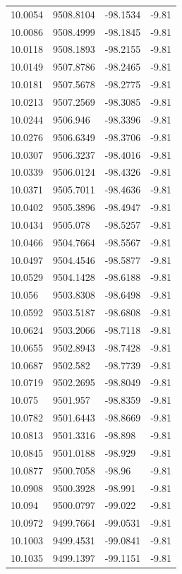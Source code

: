 \begin{table}[H]
\begin{tabular}{llll}
10.0054 & 9508.8104 & -98.1534 & -9.81 \\
10.0086 & 9508.4999 & -98.1845 & -9.81 \\
10.0118 & 9508.1893 & -98.2155 & -9.81 \\
10.0149 & 9507.8786 & -98.2465 & -9.81 \\
10.0181 & 9507.5678 & -98.2775 & -9.81 \\
10.0213 & 9507.2569 & -98.3085 & -9.81 \\
10.0244 & 9506.946 & -98.3396 & -9.81 \\
10.0276 & 9506.6349 & -98.3706 & -9.81 \\
10.0307 & 9506.3237 & -98.4016 & -9.81 \\
10.0339 & 9506.0124 & -98.4326 & -9.81 \\
10.0371 & 9505.7011 & -98.4636 & -9.81 \\
10.0402 & 9505.3896 & -98.4947 & -9.81 \\
10.0434 & 9505.078 & -98.5257 & -9.81 \\
10.0466 & 9504.7664 & -98.5567 & -9.81 \\
10.0497 & 9504.4546 & -98.5877 & -9.81 \\
10.0529 & 9504.1428 & -98.6188 & -9.81 \\
10.056 & 9503.8308 & -98.6498 & -9.81 \\
10.0592 & 9503.5187 & -98.6808 & -9.81 \\
10.0624 & 9503.2066 & -98.7118 & -9.81 \\
10.0655 & 9502.8943 & -98.7428 & -9.81 \\
10.0687 & 9502.582 & -98.7739 & -9.81 \\
10.0719 & 9502.2695 & -98.8049 & -9.81 \\
10.075 & 9501.957 & -98.8359 & -9.81 \\
10.0782 & 9501.6443 & -98.8669 & -9.81 \\
10.0813 & 9501.3316 & -98.898 & -9.81 \\
10.0845 & 9501.0188 & -98.929 & -9.81 \\
10.0877 & 9500.7058 & -98.96 & -9.81 \\
10.0908 & 9500.3928 & -98.991 & -9.81 \\
10.094 & 9500.0797 & -99.022 & -9.81 \\
10.0972 & 9499.7664 & -99.0531 & -9.81 \\
10.1003 & 9499.4531 & -99.0841 & -9.81 \\
10.1035 & 9499.1397 & -99.1151 & -9.81 \\

\end{tabular}
\end{table}
